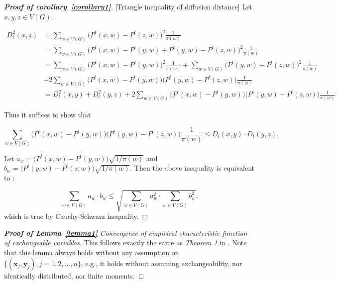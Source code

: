 \documentclass[12pt]{article}
\theoremstyle{definition}
\begin{document}
\begin{proof}[\textbf{Proof of corollary~\ref{corollary1}}][Triangle inequality of diffusion distance]
Let $x, y, z \in V(G).$
	
\begin{equation}
\begin{split}
D^{2}_{t}(x,z) & = \sum\limits_{w \in V(G)} \big( P^{t}(x,w) - P^{t}(z,w)   \big)^2 \frac{1}{\pi(w)}  \\ & = \sum\limits_{w \in V(G)} \big(P^{t}(x, w) - P^{t}(y,w) + P^{t}(y,w) - P^{t}(z,w) \big)^2 \frac{1}{\pi(w)} \\ & = \sum\limits_{w \in V(G)} \big( P^{t}(x,w) - P^{t}(y,w) \big)^2 \frac{1}{\pi(w)}  + \sum\limits_{w \in V(G)} \big( P^{t}(y,w) - P^{t}(z,w)  \big)^2 \frac{1}{\pi(w)} \\ & + 2 \sum\limits_{w \in V(G)} \big( P^{t}(x,w) - P^{t}(y,w)  \big) \big( P^{t}(y,w) - P^{t}(z,w)  \big)\frac{1}{\pi(w)} \\ &= D^{2}_{t}(x,y) + D^{2}_{t}(y,z) +  2 \sum\limits_{w \in V(G)} \big( P^{t}(x,w) - P^{t}(y,w)  \big) \big( P^{t}(y,w) - P^{t}(z,w)  \big)\frac{1}{\pi(w)}   
\end{split}
\end{equation}
	
Thus it suffices to show that 
	
\begin{equation}
\sum\limits_{w \in V(G)} \big( P^{t}(x,w) - P^{t}(y,w)  \big) \big( P^{t}(y,w) - P^{t}(z,w)  \big)\frac{1}{\pi(w)} \leq D_{t}(x,y) \cdot D_{t}(y,z). 
\end{equation}
	
Let $a_{w} = \big(P^{t}(x,w) - P^{t}(y,w) \big) \sqrt{1 / \pi(w)}$ and $b_{w} = \big( P^{t}(y,w) - P^{t}(z,w) \big) \sqrt{1 / \pi(w)}$. Then the above inequality is equivalent to :
	
\begin{equation} 
\sum\limits_{w \in V(G)} a_{w} \cdot b_{w} \leq \sqrt{\sum\limits_{w \in V(G)} a^2_{w} \cdot \sum\limits_{w \in V(G)} b^2_{w} }.
\end{equation}
which is true by Cauchy-Schwarz inequality.
\end{proof}	

\begin{proof}[\textbf{Proof of Lemma~\ref{lemma1}} Convergence of empirical characteristic function of exchangeable variables] 
	
This follows exactly the same as \textit{Theorem 1} in \cite{szekely2007measuring}. Note that this lemma always holds without any assumption on $\{(\mathbf{x}_{j},\mathbf{y}_{j}), j=1,2,...,n\}$, e.g., it holds without assuming exchangeability, nor identically distributed, nor finite moments.

\end{proof}
\end{document}
